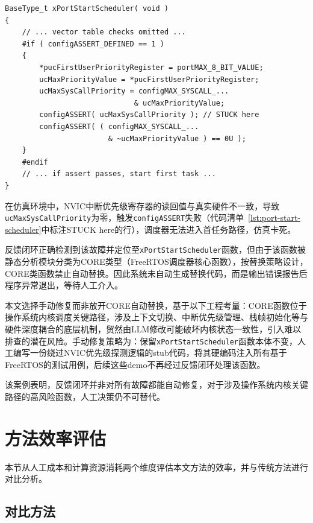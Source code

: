 \begin{lstlisting}[style=CStyle,caption={xPortStartScheduler 中的中断优先级一致性检查（FreeRTOS port.c）},label=lst:port-start-scheduler]
BaseType_t xPortStartScheduler( void )
{
    // ... vector table checks omitted ...
    #if ( configASSERT_DEFINED == 1 )
    {
        *pucFirstUserPriorityRegister = portMAX_8_BIT_VALUE;
        ucMaxPriorityValue = *pucFirstUserPriorityRegister;
        ucMaxSysCallPriority = configMAX_SYSCALL_...
                              & ucMaxPriorityValue;
        configASSERT( ucMaxSysCallPriority ); // STUCK here
        configASSERT( ( configMAX_SYSCALL_...
                        & ~ucMaxPriorityValue ) == 0U );
    }
    #endif
    // ... if assert passes, start first task ...
}
\end{lstlisting}

在仿真环境中，NVIC中断优先级寄存器的读回值与真实硬件不一致，导致\texttt{ucMaxSysCallPriority}为零，触发\texttt{configASSERT}失败（代码清单~\ref{lst:port-start-scheduler}中标注STUCK here的行），调度器无法进入首任务路径，仿真卡死。

反馈闭环正确检测到该故障并定位至\texttt{xPortStartScheduler}函数，但由于该函数被静态分析模块分类为CORE类型（FreeRTOS调度器核心函数），按替换策略设计，CORE类函数禁止自动替换。因此系统未自动生成替换代码，而是输出错误报告后程序异常退出，等待人工介入。

本文选择手动修复而非放开CORE自动替换，基于以下工程考量：CORE函数位于操作系统内核调度关键路径，涉及上下文切换、中断优先级管理、栈帧初始化等与硬件深度耦合的底层机制，贸然由LLM修改可能破坏内核状态一致性，引入难以排查的潜在风险。手动修复策略为：保留\texttt{xPortStartScheduler}函数本体不变，人工编写一份绕过NVIC优先级探测逻辑的stub代码，将其硬编码注入所有基于FreeRTOS的测试用例，后续这些demo不再经过反馈闭环处理该函数。

该案例表明，反馈闭环并非对所有故障都能自动修复，对于涉及操作系统内核关键路径的高风险函数，人工决策仍不可替代。

\section{方法效率评估}
\label{sec:efficiency_eval}

本节从人工成本和计算资源消耗两个维度评估本文方法的效率，并与传统方法进行对比分析。

\subsection{对比方法}

